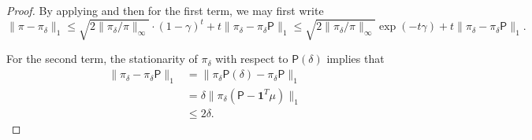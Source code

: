 \documentclass[11pt]{article}
\theoremstyle{remark}
\begin{document}
\begin{proof}
    By applying  and then  for the first term, we may first write
    \begin{equation*}
        \|\pi-\pi_{\delta}\|_1\leq \sqrt{2\|\pi_{\delta}/\pi\|_{\infty}}\cdot(1-\gamma)^{t}+t\|\pi_{\delta}-\pi_{\delta}\mathsf{P}\|_1\leq \sqrt{2\|\pi_{\delta}/\pi\|_{\infty}}\exp(-t\gamma)+t\|\pi_{\delta}-\pi_{\delta}\mathsf{P}\|_1.
    \end{equation*}

    For the second term, the stationarity of $\pi_{\delta}$ with respect to $\mathsf{P}(\delta)$ implies that
    \begin{align*}
        \|\pi_{\delta}-\pi_{\delta}\mathsf{P}\|_1&=\|\pi_{\delta}\mathsf{P}(\delta)-\pi_{\delta}\mathsf{P}\|_1\\
        &=\delta\|\pi_{\delta}(\mathsf{P}-\bm{1}^T\mu)\|_1\\
        &\leq 2\delta.
    \end{align*}


\end{proof}
\end{document}
